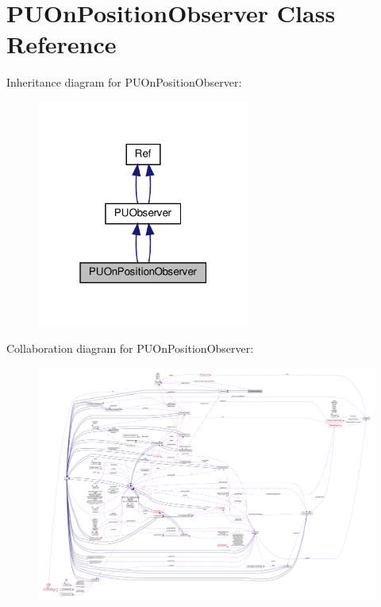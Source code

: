 \hypertarget{classPUOnPositionObserver}{}\section{P\+U\+On\+Position\+Observer Class Reference}
\label{classPUOnPositionObserver}


Inheritance diagram for P\+U\+On\+Position\+Observer\+:
\nopagebreak
\begin{figure}[H]
\begin{center}
\leavevmode
\includegraphics[width=199pt]{classPUOnPositionObserver__inherit__graph}
\end{center}
\end{figure}


Collaboration diagram for P\+U\+On\+Position\+Observer\+:
\nopagebreak
\begin{figure}[H]
\begin{center}
\leavevmode
\includegraphics[width=350pt]{classPUOnPositionObserver__coll__graph}
\end{center}
\end{figure}

